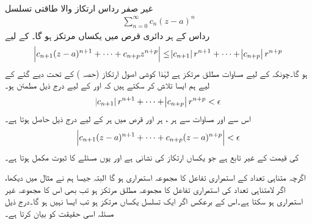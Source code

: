 \quad {}\\
غیر صفر رداس ارتکاز  والا طاقتی تسلسل
\begin{align}\label{مساوات_ٹیلر_یکساں_مرکوزیت_ثبوت_الف}
\sum\limits_{n=0}^{\infty} c_n(z-a)^n
\end{align}
رداس  کے ہر دائری قرص  میں یکساں مرتکز ہو گا۔ 
\quad
{} کے لیے
\begin{align}\label{مساوات_ٹیلر_یکساں_مرکوزیت_ثبوت_ب}
\abs{c_{n+1}(z-a)^{n+1}+\cdots+c_{n+p}z^{n+p}}\le \abs{c_{n+1}}r^{n+1}+\cdots+\abs{c_{n+p}}r^{n+p}
\end{align}
ہو گا۔چونکہ   کے لیے مساوات  مطلق مرتکز ہے لہٰذا کوشی اصول ارتکاز (حصہ ) کے تحت دیے گئے  کے لیے ہم ایسا  تلاش کر سکتے ہیں کہ  اور  کے لیے  درج ذیل مطمئن ہو۔
\begin{align*}
\abs{c_{n+1}}r^{n+1}+\cdots+\abs{c_{n+p}}r^{n+p}<\epsilon
\end{align*}
اس سے اور مساوات  سے ہر ، ہر  اور قرص  میں ہر  کے لیے درج ذیل حاصل ہوتا ہے۔
\begin{align*}
\abs{c_{n+1}(z-a)^{n+1}+\cdots+c_{n+p}(z-a)^{n+p}}<\epsilon
\end{align*}
 کی قیمت  کے غیر تابع ہے جو یکساں ارتکاز کی نشانی ہے اور یوں مسئلے کا ثبوت مکمل ہوتا ہے۔

اگرچہ متناہی تعداد کے استمراری تفاعل کا مجموعہ استمراری ہو گا البتہ جیسا ہم نے مثال  میں دیکھا، اگر لامتناہی تعداد کی استمراری تفاعل کا مجموعہ مطلق مرتکز ہو تب بھی اس کا مجموعہ  غیر استمراری ہو سکتا ہے۔اس کے برعکس اگر ایک تسلسل یکساں مرتکز ہو تب ایسا نہیں ہو گا۔درج ذیل مسئلہ اسی حقیقت کو بیان کرتا ہے۔

